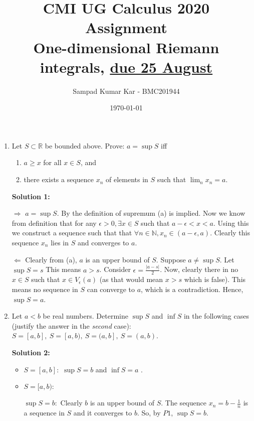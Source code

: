\documentclass[11pt]{amsart}
\newcommand{\bbR}{\mathbb{R}}
\theoremstyle{definition}
\begin{document}
\title{CMI UG Calculus 2020 Assignment\\
 {\tiny One-dimensional Riemann integrals, \underline{due 25 August}}}
\author{Sampad Kumar Kar - BMC201944}
\date{\today}
\maketitle




\begin{enumerate}[wide, labelwidth=!, labelindent=0pt]
\item Let $S \subset \bbR$ be bounded above. Prove: $a = \sup S$ iff 
\begin{enumerate}[label=(\alph*)]
\item $a \ge x$ for all $x \in S$, and
\item there exists a sequence $x_n$ of elements in $S$ such that $\lim_n x_n=a$.
\end{enumerate}

\textbf{Solution 1:}

$\Longrightarrow$ $ a = \sup S$. By the definition of supremum (a) is implied. Now we know from definition that for any $\epsilon > 0, \exists x \in S$ such that $a-\epsilon < x < a$. Using this we construct a sequence such that that $\forall n \in \mathbb{N}, x_n \in (a-\epsilon,a)$. Clearly this sequence $x_n$ lies in $S$ and converges to $a$.

$\Longleftarrow$ Clearly from (a), $a$ is an upper bound of $S$. Suppose $a \ne \sup S$. Let $\sup S = s$ This means $a > s$. Consider $\epsilon = \frac{|a-s|}{2}$. Now, clearly there in no $x \in S$ such that $x \in V_{\epsilon}(a)$ (as that would mean $x>s$ which is false). This means no sequence in $S$ can converge to $a$, which is a contradiction. Hence, $\sup S = a$.


\item  Let $a<b$ be real numbers. Determine $\sup S$ and $\inf S$ in the following cases (justify the answer in the \emph{second} case): $S=[a,b],\  S=[a,b),\ S=(a,b],\ S=(a,b)$. 

\textbf{Solution 2:}
\begin{itemize}
\item $S=[a,b]:$ $\sup S = b$ and $\inf S = a$ .
\item $S = [a,b):$

$\sup S = b:$ Clearly $b$ is an upper bound of $S$. The sequence $x_n = b-\frac{1}{n}$ is a sequence in $S$ and it converges to $b$. So, by $P1$, $\sup S = b$.


\end{itemize}
\end{enumerate}
\end{document}

